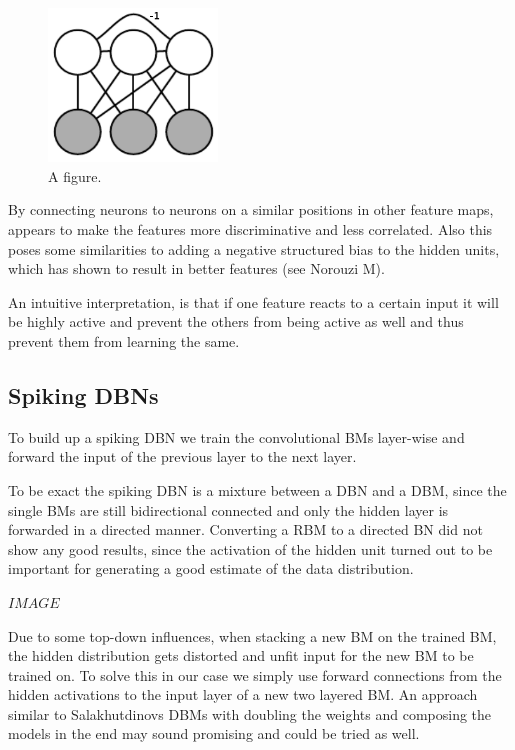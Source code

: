 \begin{figure}
	\centering
    	\includegraphics[width=0.4\textwidth]{imgs/lateral_inhib.png} 
    \caption{A figure.}
	\label{fig:test}
\end{figure}


By connecting neurons to neurons on a similar positions in other feature maps, appears to make the features more discriminative and less correlated.
Also this poses some similarities to adding a negative structured bias to the hidden units, which has shown to result in better features (see Norouzi M).

An intuitive interpretation, is that if one feature reacts to a certain input it will be highly active and prevent the others from being active as well and thus prevent them from learning the same.  

\subsection{Spiking DBNs}

To build up a spiking DBN we train the convolutional BMs layer-wise and forward the input of the previous layer to the next layer.

To be exact the spiking DBN is a mixture between a DBN and a DBM, since the single BMs are still bidirectional connected and only the hidden layer is forwarded in a directed manner.
Converting a RBM to a directed BN did not show any good results, since the activation of the hidden unit turned out to be important for generating a good estimate of the data distribution. 

$IMAGE$

Due to some top-down influences, when stacking a new BM on the trained BM, the hidden distribution gets distorted and unfit input for the new BM to be trained on. 
To solve this in our case we simply use forward connections from the hidden activations to the input layer of a new two layered BM. 
An approach similar to Salakhutdinovs DBMs with doubling the weights and composing the models in the end may sound promising and could be tried as well.

